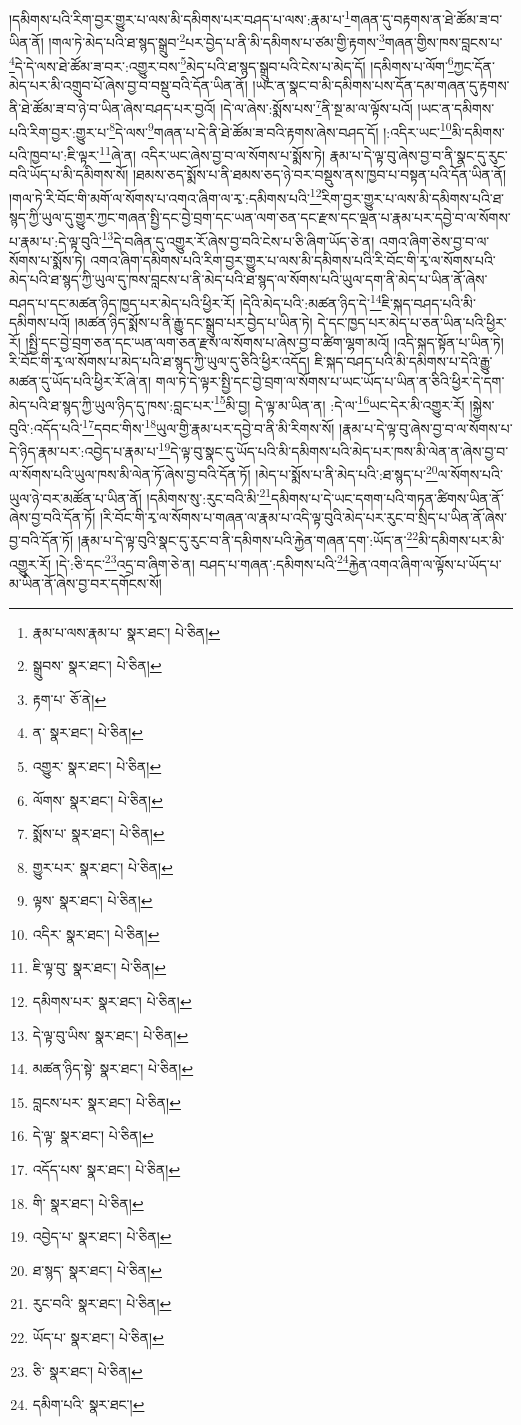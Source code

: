 །དམིགས་པའི་རིག་བྱར་གྱུར་པ་ལས་མི་དམིགས་པར་བཤད་པ་ལས་:རྣམ་པ་\footnote{རྣམ་པ་ལས་རྣམ་པ་  སྣར་ཐང་།  པེ་ཅིན། }གཞན་དུ་བརྟགས་ན་ཐེ་ཚོམ་ཟ་བ་ཡིན་ནོ། །གལ་ཏེ་མེད་པའི་ཐ་སྙད་སྒྲུབ་\footnote{སྒྲུབས་  སྣར་ཐང་།  པེ་ཅིན། }པར་བྱེད་པ་ནི་མི་དམིགས་པ་ཙམ་གྱི་རྟགས་\footnote{རྟག་པ་  ཅོ་ནེ། }གཞན་གྱིས་ཁས་བླངས་པ་\footnote{ན་  སྣར་ཐང་།  པེ་ཅིན། }དེ་དེ་ལས་ཐེ་ཚོམ་ཟ་བར་:འགྱུར་བས་\footnote{འགྱུར་  སྣར་ཐང་།  པེ་ཅིན། }མེད་པའི་ཐ་སྙད་སྒྲུབ་པའི་ངེས་པ་མེད་དོ། །དམིགས་པ་ལོག་\footnote{ལོགས་  སྣར་ཐང་།  པེ་ཅིན། }ཀྱང་དོན་མེད་པར་མི་འགྲུབ་པོ་ཞེས་བྱ་བ་བསྡུ་བའི་དོན་ཡིན་ནོ། །ཡང་ན་སྣང་བ་མི་དམིགས་པས་དོན་དམ་གཞན་དུ་རྟགས་ནི་ཐེ་ཚོམ་ཟ་བ་ཉེ་བ་ཡིན་ཞེས་བཤད་པར་བྱའོ། །དེ་ལ་ཞེས་:སྨོས་པས་\footnote{སྨོས་པ་  སྣར་ཐང་།  པེ་ཅིན། }ནི་སྔ་མ་ལ་ལྟོས་པའོ། །ཡང་ན་དམིགས་པའི་རིག་བྱར་:གྱུར་པ་\footnote{གྱུར་པར་  སྣར་ཐང་།  པེ་ཅིན། }དེ་ལས་\footnote{ལྟས་  སྣར་ཐང་།  པེ་ཅིན། }གཞན་པ་དེ་ནི་ཐེ་ཚོམ་ཟ་བའི་རྟགས་ཞེས་བཤད་དོ། །:འདིར་ཡང་\footnote{འདིར་  སྣར་ཐང་།  པེ་ཅིན། }མི་དམིགས་པའི་ཁྱབ་པ་:ཇི་ལྟར་\footnote{ཇི་ལྟ་བུ་  སྣར་ཐང་།  པེ་ཅིན། }ཞེ་ན། འདིར་ཡང་ཞེས་བྱ་བ་ལ་སོགས་པ་སྨོས་ཏེ། རྣམ་པ་དེ་ལྟ་བུ་ཞེས་བྱ་བ་ནི་སྣང་དུ་རུང་བའི་ཡོད་པ་མི་དམིགས་སོ། །ཐམས་ཅད་སྨོས་པ་ནི་ཐམས་ཅད་ཉེ་བར་བསྡུས་ནས་ཁྱབ་པ་བསྟན་པའི་དོན་ཡིན་ནོ། །གལ་ཏེ་རི་བོང་གི་མགོ་ལ་སོགས་པ་འགའ་ཞིག་ལ་རྭ་:དམིགས་པའི་\footnote{དམིགས་པར་  སྣར་ཐང་།  པེ་ཅིན། }རིག་བྱར་གྱུར་པ་ལས་མི་དམིགས་པའི་ཐ་སྙད་ཀྱི་ཡུལ་དུ་གྱུར་ཀྱང་གཞན་སྤྱི་དང་བྱེ་བྲག་དང་ཡན་ལག་ཅན་དང་རྫས་དང་ལྡན་པ་རྣམ་པར་དབྱེ་བ་ལ་སོགས་པ་རྣམ་པ་:དེ་ལྟ་བུའི་\footnote{དེ་ལྟ་བུ་ཡིས་  སྣར་ཐང་།  པེ་ཅིན། }དེ་བཞིན་དུ་འགྱུར་རོ་ཞེས་བྱ་བའི་ངེས་པ་ཅི་ཞིག་ཡོད་ཅེ་ན། འགའ་ཞིག་ཅེས་བྱ་བ་ལ་སོགས་པ་སྨོས་ཏེ། འགའ་ཞིག་དམིགས་པའི་རིག་བྱར་གྱུར་པ་ལས་མི་དམིགས་པའི་རི་བོང་གི་རྭ་ལ་སོགས་པའི་མེད་པའི་ཐ་སྙད་ཀྱི་ཡུལ་དུ་ཁས་བླངས་པ་ནི་མེད་པའི་ཐ་སྙད་ལ་སོགས་པའི་ཡུལ་དག་ནི་མེད་པ་ཡིན་ནོ་ཞེས་བཤད་པ་དང་མཚན་ཉིད་ཁྱད་པར་མེད་པའི་ཕྱིར་རོ། །དེའི་མེད་པའི་:མཚན་ཉིད་དེ་\footnote{མཚན་ཉིད་སྟེ་  སྣར་ཐང་།  པེ་ཅིན། }ཇི་སྐད་བཤད་པའི་མི་དམིགས་པའོ། །མཚན་ཉིད་སྨོས་པ་ནི་རྒྱུ་དང་སྒྲུབ་པར་བྱེད་པ་ཡིན་ཏེ། དེ་དང་ཁྱད་པར་མེད་པ་ཅན་ཡིན་པའི་ཕྱིར་རོ། །སྤྱི་དང་བྱེ་བྲག་ཅན་དང་ཡན་ལག་ཅན་རྫས་ལ་སོགས་པ་ཞེས་བྱ་བ་ཚིག་ལྷག་མའོ། །འདི་སྐད་སྟོན་པ་ཡིན་ཏེ། རི་བོང་གི་རྭ་ལ་སོགས་པ་མེད་པའི་ཐ་སྙད་ཀྱི་ཡུལ་དུ་ཅིའི་ཕྱིར་འདོད། ཇི་སྐད་བཤད་པའི་མི་དམིགས་པ་དེའི་རྒྱུ་མཚན་དུ་ཡོད་པའི་ཕྱིར་རོ་ཞེ་ན། གལ་ཏེ་དེ་ལྟར་སྤྱི་དང་བྱེ་བྲག་ལ་སོགས་པ་ཡང་ཡོད་པ་ཡིན་ན་ཅིའི་ཕྱིར་དེ་དག་མེད་པའི་ཐ་སྙད་ཀྱི་ཡུལ་ཉིད་དུ་ཁས་:བླང་པར་\footnote{བླངས་པར་  སྣར་ཐང་།  པེ་ཅིན། }མི་བྱ། དེ་ལྟ་མ་ཡིན་ན། :དེ་ལ་\footnote{དེ་ལྟ་  སྣར་ཐང་།  པེ་ཅིན། }ཡང་དེར་མི་འགྱུར་རོ། །སྐྱེས་བུའི་:འདོད་པའི་\footnote{འདོད་པས་  སྣར་ཐང་།  པེ་ཅིན། }དབང་གིས་\footnote{གི་  སྣར་ཐང་།  པེ་ཅིན། }ཡུལ་གྱི་རྣམ་པར་དབྱེ་བ་ནི་མི་རིགས་སོ། །རྣམ་པ་དེ་ལྟ་བུ་ཞེས་བྱ་བ་ལ་སོགས་པ་དེ་ཉིད་རྣམ་པར་:འབྱེད་པ་རྣམ་པ་\footnote{འབྱེད་པ་  སྣར་ཐང་།  པེ་ཅིན། }དེ་ལྟ་བུ་སྣང་དུ་ཡོད་པའི་མི་དམིགས་པའི་མེད་པར་ཁས་མི་ལེན་ན་ཞེས་བྱ་བ་ལ་སོགས་པའི་ཡུལ་ཁས་མི་ལེན་ཏོ་ཞེས་བྱ་བའི་དོན་ཏོ། །མེད་པ་སྨོས་པ་ནི་མེད་པའི་:ཐ་སྙད་པ་\footnote{ཐ་སྙད་  སྣར་ཐང་།  པེ་ཅིན། }ལ་སོགས་པའི་ཡུལ་ཉེ་བར་མཚོན་པ་ཡིན་ནོ། །དམིགས་སུ་:རུང་བའི་མི་\footnote{རུང་བའི་  སྣར་ཐང་།  པེ་ཅིན། }དམིགས་པ་དེ་ཡང་དགག་པའི་གཏན་ཚིགས་ཡིན་ནོ་ཞེས་བྱ་བའི་དོན་ཏོ། །རི་བོང་གི་རྭ་ལ་སོགས་པ་གཞན་ལ་རྣམ་པ་འདི་ལྟ་བུའི་མེད་པར་རུང་བ་སྲིད་པ་ཡིན་ནོ་ཞེས་བྱ་བའི་དོན་ཏོ། །རྣམ་པ་དེ་ལྟ་བུའི་སྣང་དུ་རུང་བ་ནི་དམིགས་པའི་རྐྱེན་གཞན་དག་:ཡོད་ན་\footnote{ཡོད་པ་  སྣར་ཐང་།  པེ་ཅིན། }མི་དམིགས་པར་མི་འགྱུར་རོ། །དེ་:ཅི་དང་\footnote{ཅི་  སྣར་ཐང་།  པེ་ཅིན། }འདྲ་བ་ཞིག་ཅེ་ན། བཤད་པ་གཞན་:དམིགས་པའི་\footnote{དམིག་པའི་  སྣར་ཐང་། }རྐྱེན་འགའ་ཞིག་ལ་ལྟོས་པ་ཡོད་པ་མ་ཡིན་ནོ་ཞེས་བྱ་བར་དགོངས་སོ། 